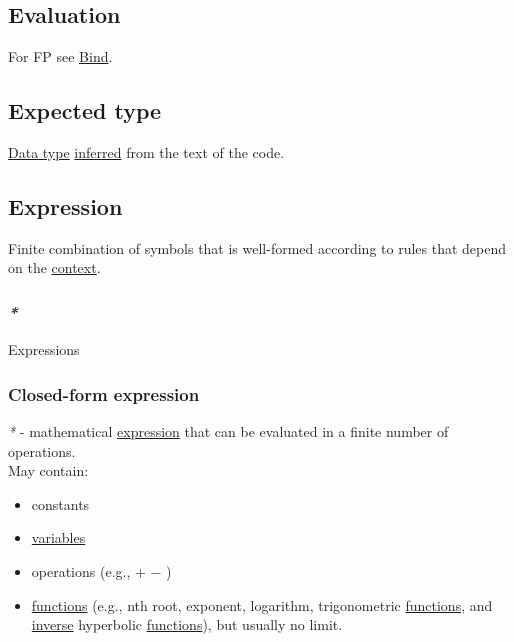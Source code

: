 \documentclass[11pt]{article}
\begin{document}
\subsection{\label{orgbb765d1}Evaluation}
\label{sec:orgb26307f}
For FP see \hyperref[org07cdf3f]{Bind}.\\

\subsection{\label{org7dcd2ac}Expected type}
\label{sec:org292be1d}
\hyperref[org212d9c3]{Data type} \hyperref[org1ccf6d8]{inferred} from the text of the code.\\

\subsection{\label{org9021dd7}Expression}
\label{sec:org81bc0c0}
Finite combination of symbols that is well-formed according to rules that depend on the \hyperref[org2ec7d4f]{context}.\\

\subsubsection{\emph{*}}
\label{sec:org4d55c88}

\label{org3731c99}Expressions\\

\subsubsection{\label{orgef71af7}Closed-form expression}
\label{sec:org84ea24f}
\emph{*} - mathematical \hyperref[org9021dd7]{expression} that can be evaluated in a finite number of operations.\\

May contain:\\
\begin{itemize}
\item constants\\
\item \hyperref[orge17f54f]{variables}\\
\item operations (e.g., + − \texttimes{} \textdiv{})\\
\item \hyperref[orgaa8fb87]{functions} (e.g., nth root, exponent, logarithm, trigonometric \hyperref[orgaa8fb87]{functions}, and \hyperref[org0da4e7e]{inverse} hyperbolic \hyperref[orgaa8fb87]{functions}), but usually no limit.\\
\end{itemize}
\end{document}
